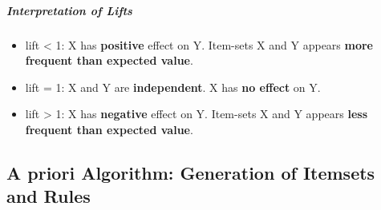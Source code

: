 \subparagraph{Interpretation of Lifts}
\begin{itemize}
	\item lift < 1: X has \textbf{positive} effect on Y. Item-sets X and Y appears \textbf{more frequent than expected value}.
	\item lift = 1: X and Y are \textbf{independent}. X has \textbf{no effect} on Y.
	\item lift > 1: X has \textbf{negative} effect on Y. Item-sets X and Y appears \textbf{less frequent than expected value}.
\end{itemize}


\subsection{A priori Algorithm: Generation of Itemsets and Rules}

